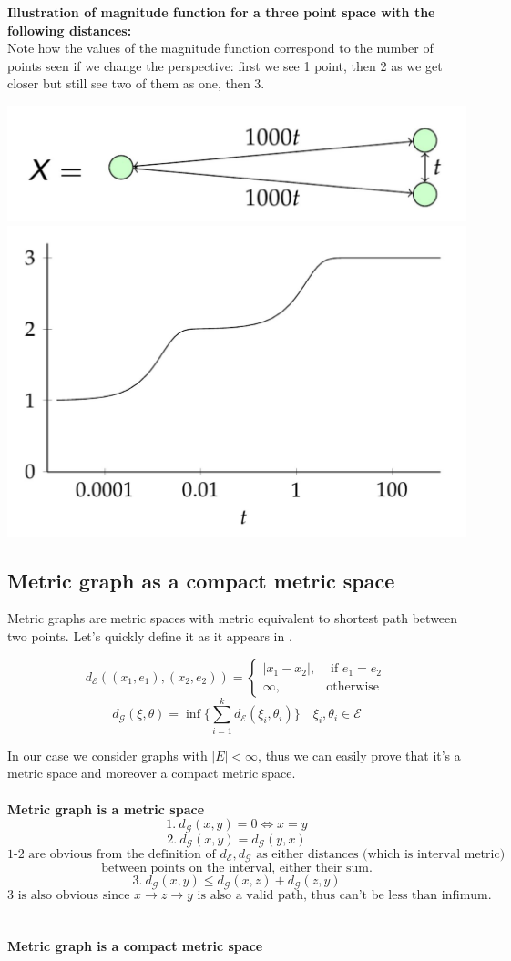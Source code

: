 \documentclass{article}
\begin{document}
\textbf{Illustration of magnitude function for a three point space with the following distances:}
\\ Note how the values of the magnitude function correspond to the number of points seen if we change the perspective: first we see 1 point, then 2 as we get closer but still see two of them as one, then 3.
\begin{center}
\includegraphics[width=.4\textwidth]{3dots} \\ 
\includegraphics[width=.35\textwidth]{mfunc3dots}
\end{center}
\subsection{Metric graph as a compact metric space}

Metric graphs are metric spaces with metric equivalent to shortest path between two points.
Let's quickly define it as it appears in \textcite{MG1}.

$$
    d_{\mathcal{E}}((x_1, e_1), (x_2, e_2)) =
    \begin{cases}
        |x_1 - x_2|, & \text{ if } e_1 = e_2 \\
        \infty, & \text{otherwise }
    \end{cases}
$$
$$ 
  d_{\mathcal{G}}(\xi, \theta) = \inf \{\sum_{i = 1}^{k} d_{\mathcal{E}}(\xi_i, \theta_i)\} \quad \xi_i, \theta_i \in \mathcal{E}
$$

In our case we consider graphs with $|E| < \infty$, thus we can easily prove that it's a metric space and moreover a compact metric space. 
\\ \\ \textbf{Metric graph is a metric space}
    \\
    $$
    1. \ d_{\mathcal{G}}(x, y) = 0 \iff x = y$$ 
    $$
    2. \ d_{\mathcal{G}}(x, y) = d_{\mathcal{G}}(y, x)
    $$
    $$\text{1-2 are obvious from the definition of } d_{\mathcal{E}}, d_{\mathcal{G}} \text{ as either distances (which is interval metric)}$$
    $$\text{between points on the interval, either their sum.}$$
    $$
    3. \ d_{\mathcal{G}}(x, y) \leq d_{\mathcal{G}}(x, z) + d_{\mathcal{G}}(z, y)
    $$
    $$
    \text{3 is also obvious since } x \rightarrow z \rightarrow y \text{ is also a valid path, thus can't be less than infimum.}
    $$
\\ \\ \textbf{Metric graph is a compact metric space}
\end{document}
